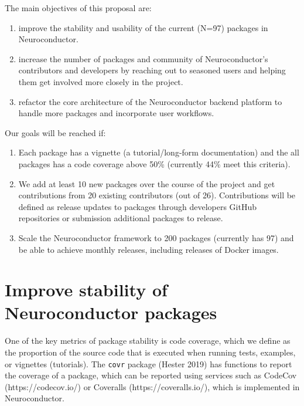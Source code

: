 \documentclass[]{elsarticle} %
\providecommand{\tightlist}{%
  \setlength{\itemsep}{0pt}\setlength{\parskip}{0pt}}
\begin{document}
The main objectives of this proposal are:

\begin{enumerate}
\def\labelenumi{\arabic{enumi}.}
\tightlist
\item
  improve the stability and usability of the current (N=97) packages in Neuroconductor.
\item
  increase the number of packages and community of Neuroconductor's contributors and developers by reaching out to seasoned users and helping them get involved more closely in the project.
\item
  refactor the core architecture of the Neuroconductor backend platform to handle more packages and incorporate user workflows.
\end{enumerate}

Our goals will be reached if:

\begin{enumerate}
\def\labelenumi{\arabic{enumi}.}
\tightlist
\item
  Each package has a vignette (a tutorial/long-form documentation) and the all packages has a code coverage above 50\% (currently 44\% meet this criteria).
\item
  We add at least 10 new packages over the course of the project and get contributions from 20 existing contributors (out of 26). Contributions will be defined as release updates to packages through developers GitHub repositories or submission additional packages to release.
\item
  Scale the Neuroconductor framework to 200 packages (currently has 97) and be able to achieve monthly releases, including releases of Docker images.
\end{enumerate}

\hypertarget{improve-stability-of-neuroconductor-packages}{%
\section{Improve stability of Neuroconductor packages}\label{improve-stability-of-neuroconductor-packages}}

One of the key metrics of package stability is code coverage, which we define as the proportion of the source code that is executed when running tests, examples, or vignettes (tutorials). The \texttt{covr} package (Hester 2019) has functions to report the coverage of a package, which can be reported using services such as CodeCov (https://codecov.io/) or Coveralls (https://coveralls.io/), which is implemented in Neuroconductor.
\end{document}
